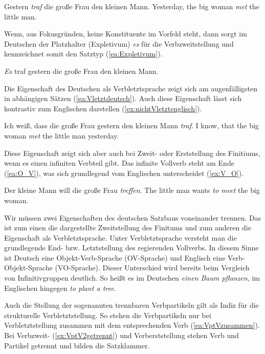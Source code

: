 \ea \label{ea:V2deutschenglisch}
\ea \label{ea:V2deutsch} Gestern \textit{traf} die große Frau den kleinen Mann.
\ex \label{ex:nichtV2englisch} Yesterday, the big woman \textit{met} the little man.
\z 
\z 

Wenn, \zB aus Fokusgründen, keine Konstituente im Vorfeld steht, dann sorgt im Deutschen der Platzhalter (Expletivum) \textit{es} für die Verbzweitstellung und kennzeichnet somit den Satztyp (\ref{ea:Expletivum}). 

\ea \label{ea:Expletivum} \textit{Es} traf gestern die große Frau den kleinen Mann.
\z 


Die Eigenschaft des Deutschen als Verbletztsprache zeigt sich am augenfälligsten in abhängigen Sätzen (\ref{ea:Vletztdeutsch}). Auch diese Eigenschaft lässt sich kontrastiv zum Englischen darstellen (\ref{ex:nichtVletztenglisch}).

\ea \label{ea:Vletztdeutschenglisch}
\ea \label{ea:Vletztdeutsch} Ich weiß, dass die große Frau gestern den kleinen Mann \textit{traf}.
\ex \label{ex:nichtVletztenglisch} I know, that the big woman \textit{met} the little man yesterday.
\z 
\z 

Diese Eigenschaft zeigt sich aber auch bei Zweit- oder Erststellung des Finitiums, wenn es einen infiniten Verbteil gibt. Das infinite Vollverb steht am Ende (\ref{ea:O_V}), was sich grundlegend vom Englischen unterscheidet (\ref{ex:V_O}). 

\ea \label{ea:VletztbeiFin2}
\ea \label{ea:O_V} Der kleine Mann will die große Frau \textit{treffen}.
\ex \label{ex:V_O} The little man wants \textit{to meet} the big woman.
\z 
\z 

Wir müssen zwei Eigenschaften des deutschen Satzbaus voneinander trennen. Das ist zum einen die dargestellte Zweitstellung des Finitums und zum anderen die Eigenschaft als Verbletztsprache. Unter Verbletztsprache versteht man die grundlegende End- bzw. Letztstellung des regierenden Vollverbs. In diesem Sinne ist Deutsch eine Objekt-Verb-Sprache (OV-Sprache) und Englisch eine Verb-Objekt-Sprache (VO-Sprache). Dieser Unterschied wird bereits beim Vergleich von Infinitivgruppen deutlich. So heißt es im Deutschen \textit{einen Baum pflanzen}, im Englischen hingegen \textit{to plant a tree}.

Auch die Stellung der sogenannten trennbaren Verbpartikeln gilt als Indiz für die strukturelle Verbletztstellung. So stehen die Verbpartikeln nur bei Verbletztstellung zusammen mit dem entsprechenden Verb (\ref{ea:VptVzusammen}). Bei Verbzweit- (\ref{ex:VptV2getrennt}) und Verberststellung stehen Verb und Partikel getrennt und bilden die Satzklammer.

